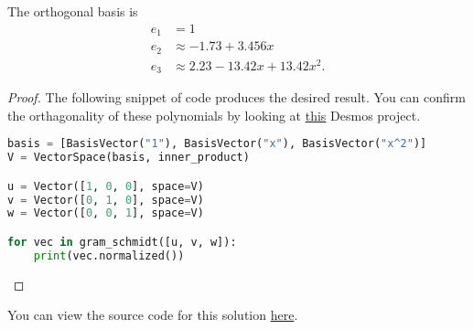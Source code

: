 \documentclass{amsart}
\newcommand{\pagenum}{190}
\newcommand{\probnum}{5}
\begin{document}
\begin{claim*}
The orthogonal basis is
\begin{align*}
    e_1 &= 1 \\
    e_2 &\approx -1.73+3.456x \\
    e_3 &\approx 2.23-13.42x+13.42x^2.
\end{align*}
\end{claim*}
\begin{proof}
The following snippet of code produces the desired result.
You can confirm the orthagonality of these polynomials
by looking at \href{https://www.desmos.com/calculator/3z6r9ky3wr}
{this} Desmos project.

\lstset{style=mystyle}
\begin{lstlisting}[language=Python]
basis = [BasisVector("1"), BasisVector("x"), BasisVector("x^2")]
V = VectorSpace(basis, inner_product)

u = Vector([1, 0, 0], space=V)
v = Vector([0, 1, 0], space=V)
w = Vector([0, 0, 1], space=V)

for vec in gram_schmidt([u, v, w]):
    print(vec.normalized())
\end{lstlisting}
\end{proof}


\begin{note*}
You can view the source code for this solution
\href{https://github.com/thomasbreydo/linalg/blob/main/\pagenum_\probnum_Thomas_Breydo.tex}
{here}.
\end{note*}
\end{document}
